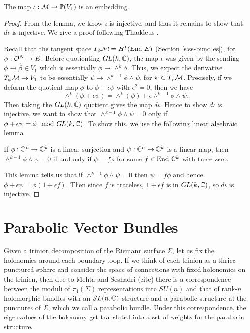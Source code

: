 	\begin{theorem}
		\label{t:det-embed}
		The map $\iota:\mathcal{M} \to \mathbb{P}(V_1)$ is an embedding.
	\end{theorem}
	\begin{proof}
		From the lemma, we know $\iota$ is injective, and thus it remains to show that $d\iota$ is injective. We give a proof following Thaddeus \cite[Prop 7.1]{thaddeus_geometric_1996}.
		
		Recall that the tangent space $T_\phi \mathcal{M} = H^1(\text{End } E)$ (Section \ref{s:ss-bundles}), for $\phi:\mathcal{O}^N \to E$. Before quotienting $GL(k,\mathbb{C})$, the map $\iota$ was given by the sending $\phi \to \hat{\beta} \in V_1$ which is essentially $\phi \to \wedge^k \phi$. Thus, we expect the derivative $T_\phi\mathcal{M}\to V_1$ to be essentially $\psi \to \wedge^{k-1}\phi \wedge \psi$, for $\psi \in T_\phi \mathcal{M}$. Precisely, if we deform the quotient map $\phi$ to $\phi + \epsilon\psi$ with $\epsilon^2 = 0$, then we have
		\begin{equation}
			\wedge^k (\phi+ \epsilon\psi) = \wedge^k(\phi) + \epsilon\wedge^{k-1}\phi\wedge \psi.
		\end{equation}
		Then taking the $GL(k,\mathbb{C})$ quotient gives the map $d\iota$. Hence to show $d\iota$ is injective, we want to show that $\wedge^{k-1}\phi \wedge \psi =0$ only if $\phi+\epsilon \psi = \phi \mod GL(k,\mathbb{C})$. To show this, we use the following linear algebraic lemma \cite[Lemma 7.2]{thaddeus_geometric_1996}
		\begin{lemma}
			If $\phi:\mathbb{C}^n \to \mathbb{C}^k$ is a linear surjection and $\psi:\mathbb{C}^n\to\mathbb{C}^k$ is a linear map, then $\wedge^{k-1}\phi\wedge\psi =0$ if and only if $\psi = f\phi$ for some $f\in \text{End } \mathbb{C}^k$ with trace zero.
		\end{lemma}
		This lemma tells us that if $\wedge^{k-1}\phi\wedge\psi=0$ then $\psi = f\phi$ and hence $\phi+\epsilon\psi = \phi(1 + \epsilon f)$. Then since $f$ is traceless, $1+\epsilon f$ is in $GL(k,\mathbb{C})$, so $d\iota$ is injective.
	\end{proof}

	\section{Parabolic Vector Bundles}
	Given a trinion decomposition of the Riemann surface $\Sigma$, let us fix the holonomies around each boundary loop. If we think of each trinion as a thrice-punctured sphere and consider the space of connections with fixed holonomies on the trinion, then due to Mehta and Seshadri (cite) there is a correspondence between the moduli of $\pi_1(\Sigma)$ representations into $SU(n)$ and that of rank-$n$ holomorphic bundles with an $SL(n,\mathbb{C})$ structure and a parabolic structure at the punctures of $\Sigma$, which we call a parabolic bundle. Under this correspondence, the eigenvalues of the holonomy get translated into a set of weights for the parabolic structure. 
	
